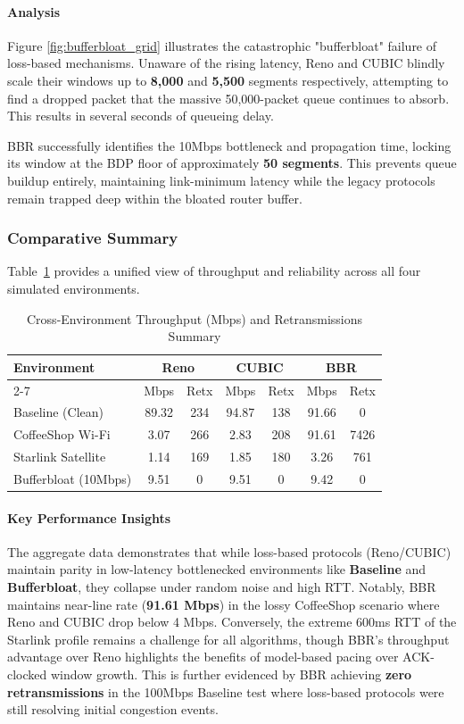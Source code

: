 \documentclass[12pt,a4paper]{article}
\begin{document}
\paragraph{Analysis}
Figure \ref{fig:bufferbloat_grid} illustrates the catastrophic "bufferbloat" failure of loss-based mechanisms. Unaware of the rising latency, Reno and CUBIC blindly scale their windows up to \textbf{8,000} and \textbf{5,500} segments respectively, attempting to find a dropped packet that the massive 50,000-packet queue continues to absorb. This results in several seconds of queueing delay.

BBR successfully identifies the 10Mbps bottleneck and propagation time, locking its window at the BDP floor of approximately \textbf{50 segments}. This prevents queue buildup entirely, maintaining link-minimum latency while the legacy protocols remain trapped deep within the bloated router buffer.

\subsubsection{Comparative Summary}
Table~\ref{tab:tcp_summary_all} provides a unified view of throughput and reliability across all four simulated environments. 

\begin{table}[H]
\centering
\caption{Cross-Environment Throughput (Mbps) and Retransmissions Summary}
\label{tab:tcp_summary_all}
\begin{tabular}{|l|c|c|c|c|c|c|}
\hline
\textbf{Environment} & \multicolumn{2}{c|}{\textbf{Reno}} & \multicolumn{2}{c|}{\textbf{CUBIC}} & \multicolumn{2}{c|}{\textbf{BBR}} \\
\cline{2-7}
 & Mbps & Retx & Mbps & Retx & Mbps & Retx \\
\hline
Baseline (Clean) & 89.32 & 234 & 94.87 & 138 & 91.66 & 0 \\
CoffeeShop Wi-Fi & 3.07 & 266 & 2.83 & 208 & 91.61 & 7426 \\
Starlink Satellite & 1.14 & 169 & 1.85 & 180 & 3.26 & 761 \\
Bufferbloat (10Mbps) & 9.51 & 0 & 9.51 & 0 & 9.42 & 0 \\
\hline
\end{tabular}
\end{table}

\paragraph{Key Performance Insights}
The aggregate data demonstrates that while loss-based protocols (Reno/CUBIC) maintain parity in low-latency bottlenecked environments like \textbf{Baseline} and \textbf{Bufferbloat}, they collapse under random noise and high RTT. Notably, BBR maintains near-line rate (\textbf{91.61 Mbps}) in the lossy CoffeeShop scenario where Reno and CUBIC drop below 4 Mbps. Conversely, the extreme 600ms RTT of the Starlink profile remains a challenge for all algorithms, though BBR's throughput advantage over Reno highlights the benefits of model-based pacing over ACK-clocked window growth. This is further evidenced by BBR achieving \textbf{zero retransmissions} in the 100Mbps Baseline test where loss-based protocols were still resolving initial congestion events.
\end{document}
